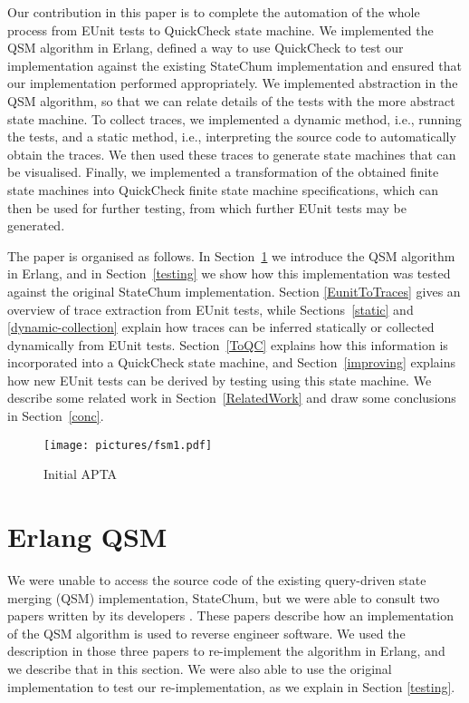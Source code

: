 \documentclass[]{sigplanconf}
\begin{document}
Our contribution in this paper is to complete the automation of the whole process from EUnit tests to QuickCheck state machine. %
We implemented the QSM algorithm in Erlang, defined a way to use QuickCheck to test our implementation against the existing StateChum implementation and ensured that our implementation performed appropriately. We implemented abstraction in the QSM algorithm, so that we can relate details of the tests with the more abstract state machine. To collect traces, we implemented a dynamic method, i.e., running the tests, and a static method, i.e., interpreting the source code to automatically obtain the traces. We then used these traces to generate state machines that can be visualised. Finally, we implemented a transformation of the obtained finite state machines into QuickCheck finite state machine specifications, which can then be used for further testing, from which further EUnit tests may be generated.

The paper is organised as follows. In Section~\ref{QSM} we introduce the QSM algorithm in Erlang, and in Section~\ref{testing} we show how this implementation was tested against the original StateChum implementation. Section \ref{EunitToTraces} gives an overview of trace extraction from EUnit tests, while Sections~\ref{static} and \ref{dynamic-collection} explain how traces can be inferred statically or collected dynamically from EUnit tests. Section~\ref{ToQC} explains how this information is incorporated into a QuickCheck state machine, and Section~\ref{improving} explains how new EUnit tests can be derived by testing using this state machine. We describe some related work in Section~\ref{RelatedWork} and draw some conclusions in Section~\ref{conc}. 

\begin{figure}
\begin{center}
\texttt{[image: pictures/fsm1.pdf]}
\end{center}
\caption{Initial APTA}
\label{fsm1}
\end{figure}



\section{Erlang QSM}
\label{QSM}

We were unable to access the source code of the existing query-driven state merging (QSM) implementation, StateChum, but
we were able to consult two papers written by its developers
\cite{walkinshaw2008inferring,walkinshaw2007reverse}.
These papers describe how an implementation of
the QSM algorithm \cite{dupont2008qsm} is used to reverse engineer software.
We used the description in those three papers to re-implement the
algorithm in Erlang, and we describe that in this section. We were also able to use the original implementation to test our re-implementation, as we explain in  Section \ref{testing}.
\end{document}
